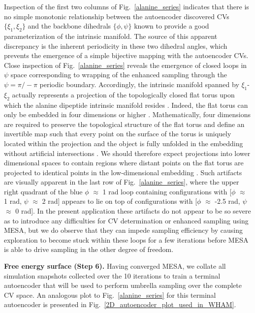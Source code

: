 \documentclass[12pt]{article}
\newcommand*{\blauw}[1]{#1}
\begin{document}
Inspection of the first two columns of \blauw{Fig.~\ref{alanine_series}} indicates that there is no simple monotonic relationship between the autoencoder discovered CVs $\{\xi_1,\xi_2\}$ and the backbone dihedrals $\{\phi,\psi\}$ known to provide a good parameterization of the intrinsic manifold. The source of this apparent discrepancy is the inherent periodicity in these two dihedral angles, which prevents the emergence of a simple bijective mapping with the autoencoder CVs. Close inspection of \blauw{Fig.~\ref{alanine_series}} reveals the emergence of closed loops in $\psi$ space corresponding to wrapping of the enhanced sampling through the $\psi = \pi / -\pi$ periodic boundary. Accordingly, the intrinsic manifold spanned by $\xi_1$-$\xi_2$ actually represents a projection of the topologically closed flat torus upon which the alanine dipeptide intrinsic manifold resides \cite{hashemian2015topological}. Indeed, the flat torus can only be embedded in four dimensions or higher \cite{patrangenaru2015nonparametric}. Mathematically, four dimensions are required to preserve the topological structure of the flat torus and define an invertible map such that every point on the surface of the torus is uniquely located within the projection and the object is fully unfolded in the embedding without artificial intersections \cite{patrangenaru2015nonparametric,whitney1936differentiable,broomhead1986extracting}. We should therefore expect projections into lower dimensional spaces to contain regions where distant points on the flat torus are projected to identical points in the low-dimensional embedding \cite{hashemian2015topological}. Such artifacts are visually apparent in the last row of \blauw{Fig.~\ref{alanine_series}}, where the upper right quadrant of the blue $\phi$ $\approx$ 1 rad loop containing configurations with [$\phi$ $\approx$ 1 rad, $\psi$ $\approx$ 2 rad] appears to lie on top of configurations with [$\phi$ $\approx$ -2.5 rad, $\psi$ $\approx$ 0 rad]. In the present application these artifacts do not appear to be so severe as to introduce any difficulties for CV determination or enhanced sampling using MESA, but we do observe that they can impede sampling efficiency by causing exploration to become stuck within these loops for a few iterations before MESA is able to drive sampling in the other degree of freedom.




\textbf{Free energy surface (Step 6).} Having converged MESA, we collate all simulation snapshots collected over the 10 iterations to train a terminal autoencoder that will be used to perform umbrella sampling over the complete CV space. An analogous plot to \blauw{Fig.~\ref{alanine_series}} for this terminal autoencoder is presented in \blauw{Fig.~\ref{2D_autoencoder_plot_used_in_WHAM}}. 
\end{document}
